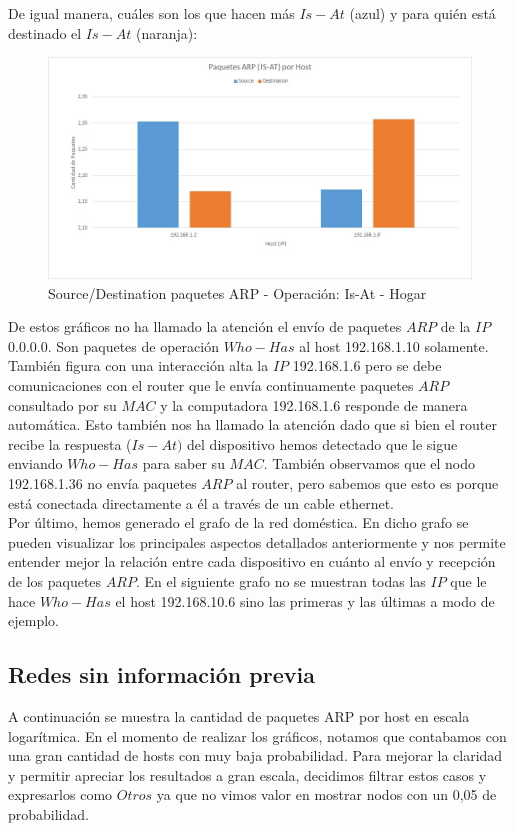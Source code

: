 De igual manera, cuáles son los que hacen más $Is-At$ (azul) y para quién está destinado el $Is-At$ (naranja):

\begin{figure}[h!]
\centering
\includegraphics[scale=0.5]{./img/arp_isAt_casa.jpg}
\caption{Source/Destination paquetes ARP - Operación: Is-At - Hogar}
\end{figure}

De estos gráficos no ha llamado la atención el envío de paquetes $ARP$ de la $IP$ $0.0.0.0$. Son paquetes de operación $Who-Has$ al host
192.168.1.10 solamente. También figura con una interacción alta la $IP$ 192.168.1.6 pero se debe comunicaciones con el router que le envía
continuamente paquetes $ARP$ consultado por su $MAC$ y la computadora 192.168.1.6 responde de manera automática. Esto también nos ha llamado la 
atención dado que si bien el router recibe la respuesta ($Is-At)$ del dispositivo hemos detectado que le sigue enviando $Who-Has$ para saber su $MAC$.
También observamos que el nodo 192.168.1.36 no envía paquetes $ARP$ al router, pero sabemos que esto es porque está conectada directamente
a él a través de un cable ethernet.\\

Por último, hemos generado el grafo de la red doméstica. En dicho grafo se pueden visualizar los principales aspectos 
detallados anteriormente y nos permite entender mejor la relación entre cada dispositivo en cuánto al envío y recepción de los paquetes $ARP$.
En el siguiente grafo no se muestran todas las $IP$ que le hace $Who-Has$ el host 192.168.10.6 sino las primeras y las últimas a modo de ejemplo.


\subsection{Redes sin información previa}
A continuación se muestra la cantidad de paquetes ARP por host en escala logarítmica. 
En el momento de realizar los gráficos, notamos que contabamos con una gran cantidad de hosts con muy baja probabilidad. 
Para mejorar la claridad y permitir apreciar los resultados a gran escala, decidimos filtrar estos casos y expresarlos como $Otros$ ya que 
no vimos valor en mostrar nodos con un 0,05 de probabilidad.\\

